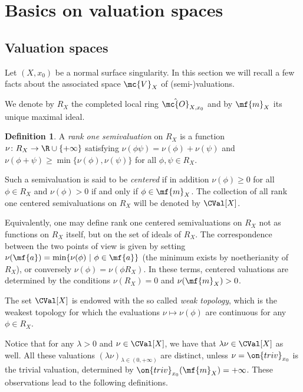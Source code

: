 \documentclass[11 pt, twoside, a4paper]{amsart}
\theoremstyle{definition}
\newtheorem{defi}[thm]{Definition}
\theoremstyle{definition}
\newcommand{\Val}[1][]{\mc{V}_{#1}}
\newcommand{\triv}{\on{triv}}
\begin{document}
\section{Basics on valuation spaces}\label{sec:valspaces}


\subsection{Valuation spaces}

Let $(X,x_0)$ be a normal surface singularity. In this section we will recall a few facts about the associated space $\Val[X]$ of (semi-)valuations.

We denote by $R_X$ the completed local ring $\hat{\mc{O}}_{X,x_0}$ and by $\mf{m}_X$ its unique maximal ideal.

\begin{defi}
A \emph{rank one semivaluation} on $R_X$ is a function $\nu\colon R_X\to \R\cup\{+\infty\}$ satisfying $\nu(\phi\psi) = \nu(\phi) + \nu(\psi)$ and $\nu(\phi + \psi)\geq \min\{\nu(\phi), \nu(\psi)\}$ for all $\phi, \psi\in R_X$.

Such a semivaluation is said to be \emph{centered} if in addition $\nu(\phi)\geq 0$ for all $\phi\in R_X$ and $\nu(\phi)>0$ if and only if $\phi\in \mf{m}_X$. The collection of all rank one centered semivaluations on $R_X$ will be denoted by $\CVal[X]$.
\end{defi}

Equivalently, one may define rank one centered semivaluations on $R_X$ not as functions on $R_X$ itself, but on the set of ideals of $R_X$.
The correspondence between the two points of view is given by setting $\nu(\mf{a})=\min\{\nu(\phi)\ |\ \phi \in \mf{a}\}$ (the minimum exists by noetherianity of $R_X$), or conversely $\nu(\phi)=\nu(\phi R_X)$.
In these terms, centered valuations are determined by the conditions $\nu(R_X)=0$ and $\nu(\mf{m}_X)>0$.

The set $\CVal[X]$ is endowed with the so called \emph{weak topology}, which is the weakest topology for which the evaluations $\nu \mapsto \nu(\phi)$ are continuous for any $\phi \in R_X$.

Notice that for any $\lambda > 0$ and $\nu \in \CVal[X]$, we have that $\lambda\nu \in \CVal[X]$ as well. All these valuations $(\lambda \nu)_{\lambda \in (0,+\infty)}$ are distinct, unless $\nu=\triv_{x_0}$ is the trivial valuation, determined by $\triv_{x_0}(\mf{m}_X)=+\infty$.
These observations lead to the following definitions.
\end{document}
